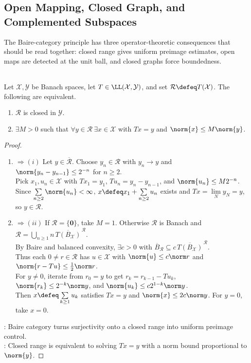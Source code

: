 \subsection{Open Mapping, Closed Graph, and Complemented Subspaces}

The Baire-category principle has three operator-theoretic consequences that should be read together: closed range gives uniform preimage estimates, open maps are detected at the unit ball, and closed graphs force boundedness.

\begin{theorem} \label{thm:closed-range-estimate} \\
Let $\mathcal{X},\mathcal{Y}$ be Banach spaces, let $T\in\LL(\mathcal{X},\mathcal{Y})$, and set $\mathcal R\defeq T(\mathcal X)$. The following are equivalent.
\begin{enumerate}[label=(\roman*)]
\setlength{\itemsep}{0pt}
\item $\mathcal R$ is closed in $\mathcal Y$.
\item $\exists M>0$ such that $\forall y\in\mathcal R\ \exists x\in\mathcal X$ with $Tx=y$ and $\norm{x}\leq M\norm{y}$.
\end{enumerate}
\begin{proof}
\begin{enumerate}[label=(\roman*)]
\setlength{\itemsep}{0pt}
\item[$(ii)$]$\Rightarrow (i)$ Let $y\in\overline{\mathcal R}$. Choose $y_n\in\mathcal R$ with $y_n\to y$ and $\norm{y_n-y_{n-1}}\leq2^{-n}$ for $n\geq2$.\\
Pick $x_1,u_n\in\mathcal X$ with $Tx_1=y_1$, $Tu_n=y_n-y_{n-1}$, and $\norm{u_n}\leq M2^{-n}$.\\
Since $\sum\limits_{n\geq2}\norm{u_n}<\infty$, $x\defeq x_1+\sum\limits_{n\geq2}u_n$ exists and $Tx=\lim\limits_Ny_N=y$, so $y\in\mathcal R$.
\item[$(i)$]$\Rightarrow (ii)$ If $\mathcal R=\{\mathbf0\}$, take $M=1$. Otherwise $\mathcal R$ is Banach and $\mathcal R=\bigcup\limits_{n\geq1}n\,\overline{T(B_{\mathcal X})}^{\,\mathcal R}$.\\
By Baire and balanced convexity, $\exists c>0$ with $\overline{B}_{\mathcal R}\subseteq c\,\overline{T(B_{\mathcal X})}^{\,\mathcal R}$.\\
Thus each $0\neq r\in\mathcal R$ has $u\in\mathcal X$ with $\norm{u}\leq c\norm r$ and $\norm{r-Tu}\leq\frac{1}{2}\norm r$.\\
For $y\neq0$, iterate from $r_0=y$ to get $r_k=r_{k-1}-Tu_k$, $\norm{r_k}\leq2^{-k}\norm y$, and $\norm{u_k}\leq c2^{1-k}\norm y$.\\
Then $x\defeq\sum\limits_{k\geq1}u_k$ satisfies $Tx=y$ and $\norm{x}\leq2c\norm y$. For $y=0$, take $x=0$.
\end{enumerate}
: Baire category turns surjectivity onto a closed range into uniform preimage control.\\
: Closed range is equivalent to solving $Tx=y$ with a norm bound proportional to $\norm{y}$.
\end{proof}
\end{theorem}

